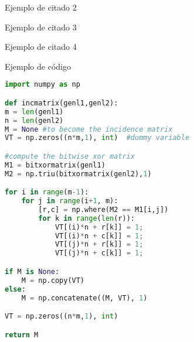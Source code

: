 Ejemplo de citado 2 

Ejemplo de citado 3 \cite{baggio}

Ejemplo de citado 4 

Ejemplo de código

\begin{lstlisting}[language=Python, caption=Python example]
import numpy as np

def incmatrix(genl1,genl2):
m = len(genl1)
n = len(genl2)
M = None #to become the incidence matrix
VT = np.zeros((n*m,1), int)  #dummy variable

#compute the bitwise xor matrix
M1 = bitxormatrix(genl1)
M2 = np.triu(bitxormatrix(genl2),1) 

for i in range(m-1):
	for j in range(i+1, m):
		[r,c] = np.where(M2 == M1[i,j])
		for k in range(len(r)):
			VT[(i)*n + r[k]] = 1;
			VT[(i)*n + c[k]] = 1;
			VT[(j)*n + r[k]] = 1;
			VT[(j)*n + c[k]] = 1;

if M is None:
	M = np.copy(VT)
else:
	M = np.concatenate((M, VT), 1)

VT = np.zeros((n*m,1), int)

return M
\end{lstlisting}